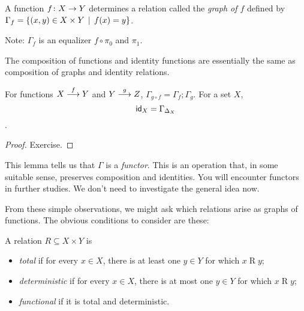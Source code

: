 \begin{defn}
	A function $\fromto fXY$ determines a relation called the \emph{graph of $f$} defined by 
	$\Gamma_f = \{(x,y)\in X\times Y\st f(x)=y\}$.
	
	Note: $\Gamma_f$ is an equalizer $f\circ\pi_0$ and $\pi_1$.
\end{defn}

The composition of functions and identity functions are essentially the same as composition of graphs and identity relations.

\begin{lemma}
	For functions $\sfromto fXY$ and $\sfromto gYZ$, $\Gamma_{g\circ f} = \Gamma_f;\Gamma_g$.
	For a set $X$, \[\id_X = \Gamma_{\Delta_X}\]. 
	
	\begin{proof}
		Exercise.
	\end{proof}
\end{lemma}

This lemma tells us that $\Gamma$ is a \emph{functor}. This is an operation that, in some suitable sense, preserves composition and identities. You will encounter functors in further studies. We don't need to investigate the general idea now.

From these simple observations, we might ask which relations arise as graphs of functions. The obvious conditions to consider are these:

\begin{defn}
A relation $R\subseteq {X\times Y}$ is
\begin{itemize}
	\item \emph{total} if for every $x\in X$, there is at least one $y\in Y$ for which $x\mathrel{R}y$;
	\item \emph{deterministic} if for every $x\in X$, there is at most one $y\in Y$ for which $x\mathrel{R}y$;
	\item \emph{functional} if it is total and deterministic.
\end{itemize}
\end{defn}

